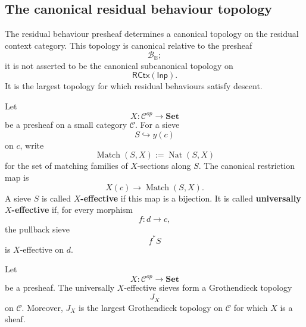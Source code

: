 \subsection{The canonical residual behaviour topology}
\label{subsec:canonical-residual-behaviour-topology}

The residual behaviour presheaf determines a canonical topology on the
residual context category. This topology is canonical relative to the presheaf
\[
    \mathcal B_{\mathbb B};
\]
it is not asserted to be the canonical subcanonical topology on
\[
    \mathsf{RCtx}(\mathsf{Inp}).
\]
It is the largest topology for which residual behaviours satisfy descent.

Let
\[
    X:\mathcal C^{op}\to\mathbf{Set}
\]
be a presheaf on a small category \(\mathcal C\). For a sieve
\[
    S\hookrightarrow y(c)
\]
on \(c\), write
\[
    \operatorname{Match}(S,X)
    :=
    \operatorname{Nat}(S,X)
\]
for the set of matching families of \(X\)-sections along \(S\). The canonical
restriction map is
\[
    X(c)\to\operatorname{Match}(S,X).
\]
A sieve \(S\) is called \textbf{\(X\)-effective} if this map is a bijection.
It is called \textbf{universally \(X\)-effective} if, for every morphism
\[
    f:d\to c,
\]
the pullback sieve
\[
    f^*S
\]
is \(X\)-effective on \(d\).

\begin{lemma}
\label{lem:topology-generated-by-a-presheaf}
    Let
    \[
        X:\mathcal C^{op}\to\mathbf{Set}
    \]
    be a presheaf. The universally \(X\)-effective sieves form a Grothendieck
    topology
    \[
        J_X
    \]
    on \(\mathcal C\). Moreover, \(J_X\) is the largest Grothendieck topology
    on \(\mathcal C\) for which \(X\) is a sheaf.
\end{lemma}

